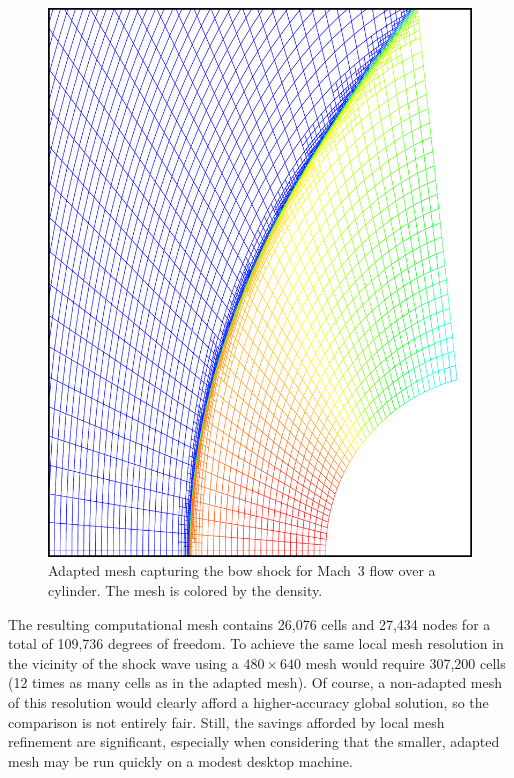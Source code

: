 \begin{figure}[hbtp]
  \begin{center}
    \includegraphics[height=.85\textheight]{figures/mach3_cylinder/rho_amr_mesh}
    \caption[Adapted mesh capturing the bow shock for Mach~3 flow over a cylinder.]{Adapted mesh capturing the bow shock for Mach~3 flow over a cylinder.  The mesh is colored by the density.\label{fig:cyl_amr}}
  \end{center}
\end{figure}

The resulting computational mesh contains 26,076 cells and 27,434 nodes for a total of 109,736 degrees of freedom.  To achieve the same local mesh resolution in the vicinity of the shock wave using a $480 \times 640$ mesh would require 307,200 cells (12 times as many cells as in the adapted mesh).  Of course, a non-adapted mesh of this resolution would clearly afford a higher-accuracy global solution, so the comparison is not entirely fair.  Still, the savings afforded by local mesh refinement are significant, especially when considering that the smaller, adapted mesh may be run quickly on a modest desktop machine.


